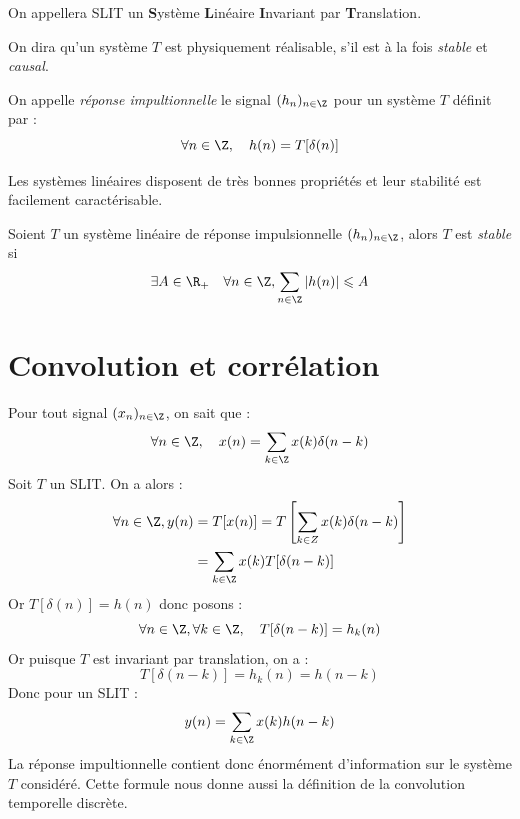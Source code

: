 On appellera SLIT un \textbf{S}ystème \textbf{L}inéaire \textbf{I}nvariant par \textbf{T}ranslation. 

\begin{definition}
    On dira qu'un système $T$ est physiquement réalisable, s'il est à la fois \emph{stable} 
    et \emph{causal}. 
\end{definition}

\begin{definition}
    On appelle \emph{réponse impultionnelle} le signal $(h_n)_{n \in \Z}$ pour un système 
    $T$ définit par : 
        \begin{equation}
            \forall n \in \Z, \quad h(n) = T[ \delta(n)]
        \end{equation}
\end{definition}

Les systèmes linéaires disposent de très bonnes propriétés et leur stabilité est facilement 
caractérisable. 

\begin{proposition}
    Soient $T$ un système linéaire de réponse impulsionnelle $(h_n)_{n \in \Z}$, alors 
    $T$ est \emph{stable} si 
    \begin{equation}
        \exists A \in \R_+ \quad \forall n \in \Z, \sum_{n \in \Z} |h(n)| \leqslant A 
    \end{equation}
\end{proposition}



\section{Convolution et corrélation}

Pour tout signal $(x_n)_{n \in \Z}$, on sait que : 
    $$ \forall n \in \Z, \quad x(n) = \sum_{k \in \Z} x(k) \delta(n - k) $$ 
Soit $T$ un SLIT. On a alors : 
    \begin{align*}
        \forall n \in \Z, y(n) &= T[x(n)] = T\left[ \sum_{k \in Z} x(k) \delta(n - k)\right] \\ 
        &= \sum_{k \in \Z} x(k) T[ \delta(n - k)]
    \end{align*}
Or $T[ \delta(n)] = h(n)$ donc posons : 
    $$ \forall n \in \Z, \forall k \in \Z, \quad T[ \delta(n - k)] = h_k (n) $$ 
Or puisque $T$ est invariant par translation, on a : 
    $$ T[ \delta(n - k)] = h_k(n) = h(n - k) $$
Donc pour un SLIT : 
    $$ y(n) = \sum_{k \in \Z} x(k) h(n - k) $$
La réponse impultionnelle contient donc énormément d'information sur le système $T$ considéré. 
Cette formule nous donne aussi la définition de la convolution temporelle discrète. 

